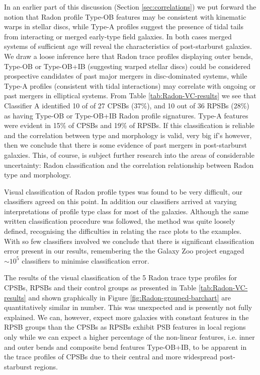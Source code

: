 In an earlier part of this discussion (Section  \ref{sec:correlations}) we put forward the notion that Radon profile Type-OB features may be consistent with kinematic warps in stellar discs, while Type-A profiles suggest the presence of tidal tails from interacting or merged early-type field galaxies. In both cases merged systems of sufficient age will reveal the characteristics of post-starburst galaxies. We draw a loose inference here that Radon trace profiles displaying outer bends, Type-OB or Type-OB+IB (suggesting warped stellar discs) could be considered prospective candidates of past major mergers in disc-dominated systems, while Type-A profiles (consistent with tidal interactions) may correlate with ongoing or past mergers in elliptical systems. From Table \ref{tab:Radon-VC-results} we see that Classifier A identified 10 of of 27 CPSBs (37\%), and 10 out of 36 RPSBs (28\%) as having Type-OB or Type-OB+IB Radon profile signatures. Type-A features were evident in  15\% of CPSBs and 19\% of RPSBs. If this classification is reliable and the correlation between type and morphology is valid, very big if's however, then we conclude that there is some evidence of past mergers in post-starburst galaxies. This, of course, is subject further research into the areas of considerable uncertainty: Radon classification and the correlation relationship between Radon type and morphology.

Visual classification of Radon profile types was found to be very difficult, our classifiers agreed on this point. In addition our classifiers arrived at varying interpretations of profile type class for most of the galaxies. Although the same written classification procedure was followed, the method was quite loosely defined, recognising the difficulties in relating the race plots to the examples. With so few classifiers involved we conclude that there is significant classification error present in our results, remembering the the Galaxy Zoo project engaged $\sim10^5$ classifiers to minimise classification error.

The results of the visual classification of the 5 Radon trace type profiles for CPSBs, RPSBs and their control groups as presented in Table \ref{tab:Radon-VC-results} and shown graphically in Figure \ref{fig:Radon-grouped-barchart} are quantitatively similar in number. This was unexpected and is presently not fully explained. We can, however, expect more galaxies with constant features in the RPSB groups than the CPSBs as RPSBs exhibit PSB features in local regions only while we can expect a higher percentage of the non-linear features, i.e. inner and outer bends and composite bend features Type-OB+IB, to be apparent in the trace profiles of CPSBs due to their central and more widespread post-starburst regions. 

